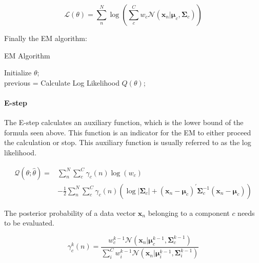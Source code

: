 \begin{equation}
\label{eq:gmm_normlike}
\mathcal{L} \left(\theta \right) = \sum\limits_n^N \log \left( \sum\limits_c^C w_c \mathcal{N}\left(\mathbf{x}_n |\boldsymbol{\mu}_c,\boldsymbol{\Sigma}_c \right) \right)
\end{equation}

Finally the EM algorithm:
\begin{algorithm}
\caption{EM Algorithm}
Initialize $\theta$; \\
previous = Calculate Log Likelihood $Q(\theta)$; \\
\end{algorithm}

\paragraph*{E-step}
The E-step calculates an auxiliary function, which is the lower bound of the formula seen above. This function is an indicator for the EM to either proceed the calculation or stop. This auxiliary function is usually referred to as the log likelihood.

\begin{equation}
\label{eq:llk}
\begin{split}
\mathcal{Q} \left(\theta;\hat{\theta} \right) =& \sum\limits_n^N \sum\limits_c^C \gamma_{c}(n) \log \left(w_c \right) \\ 
& - \frac{1}{2} \sum\limits_n^N \sum\limits_c^C \gamma_{c}(n) \left( \log |\mathbf{\Sigma}_c| + \left(\mathbf{x}_n - {\boldsymbol{\mu}_c} \right)^{'} \mathbf{\Sigma}_c^{-1} \left( \mathbf{x}_n - {\boldsymbol{\mu}_c}\right)\right)
\end{split}
\end{equation}

The posterior probability of a data vector $\mathbf{x}_n$ belonging to a component $c$ needs to be evaluated.

\begin{equation}
\gamma_c^k(n) = \frac{w_c^{k-1} \mathcal{N} \left( \mathbf{x}_n | \boldsymbol{\mu}_c^{k-1} , \mathbf{\Sigma}_c^{k-1} \right)}{
\sum\limits_i^C w_i^{k-1} \mathcal{N} \left( \mathbf{x}_n | \boldsymbol{\mu}_i^{k-1}, \mathbf{\Sigma}_i^{k-1}\right)}
\end{equation}

